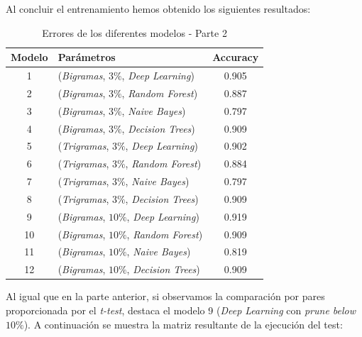 \documentclass[12pt]{report} %
\begin{document}
    Al concluir el entrenamiento hemos obtenido los siguientes resultados:

    \begin{table}[H]
        \begin{center}
            \begin{tabular}{ @{}clc@{} }
                \toprule
                Modelo & Parámetros\footnotemark[2] & Accuracy\\
                \midrule
                1  & (\textit{Bigramas},  $3\%$, \textit{Deep Learning})  & 0.905\\
                2  & (\textit{Bigramas},  $3\%$, \textit{Random Forest})  & 0.887\\
                3  & (\textit{Bigramas},  $3\%$, \textit{Naive Bayes})    & 0.797\\
                4  & (\textit{Bigramas},  $3\%$, \textit{Decision Trees}) & 0.909\\
                5  & (\textit{Trigramas}, $3\%$, \textit{Deep Learning})  & 0.902\\
                6  & (\textit{Trigramas}, $3\%$, \textit{Random Forest})  & 0.884\\
                7  & (\textit{Trigramas}, $3\%$, \textit{Naive Bayes})    & 0.797\\
                8  & (\textit{Trigramas}, $3\%$, \textit{Decision Trees}) & 0.909\\
                9  & (\textit{Bigramas}, $10\%$, \textit{Deep Learning})  & 0.919\\
                10 & (\textit{Bigramas}, $10\%$, \textit{Random Forest})  & 0.909\\
                11 & (\textit{Bigramas}, $10\%$, \textit{Naive Bayes})    & 0.819\\
                12 & (\textit{Bigramas}, $10\%$, \textit{Decision Trees}) & 0.909\\
                \bottomrule
            \end{tabular}
            \caption{Errores de los diferentes modelos - Parte 2}
        \end{center}
    \end{table}

    Al igual que en la parte anterior, si observamos la comparación por pares
    proporcionada por el \textit{t-test}, destaca el modelo 9 (\textit{Deep Learning}
    con \textit{prune below $10\%$}). A continuación se muestra la matriz resultante
    de la ejecución del test:
\end{document}
